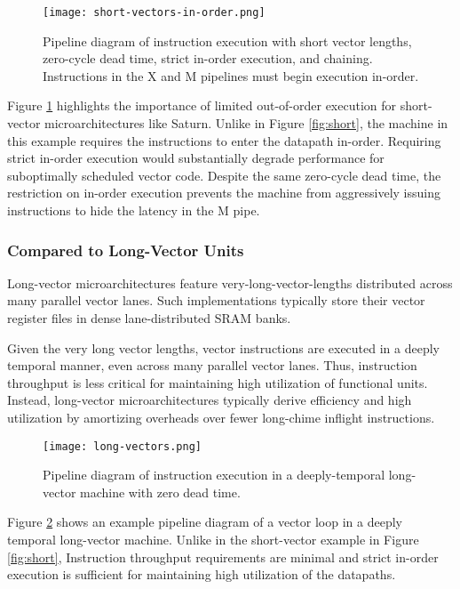 \begin{figure}[h]
  \centering
  \texttt{[image: short-vectors-in-order.png]}
  \caption{Pipeline diagram of instruction execution with short vector lengths, zero-cycle dead time, strict in-order execution, and chaining. Instructions in the X and M pipelines must begin execution in-order.}
  \label{fig:short-inorder}
\end{figure}

Figure \ref{fig:short-inorder} highlights the importance of limited out-of-order execution for short-vector microarchitectures like Saturn.
Unlike in Figure \ref{fig:short}, the machine in this example requires the instructions to enter the datapath in-order.
Requiring strict in-order execution would substantially degrade performance for suboptimally scheduled vector code.
Despite the same zero-cycle dead time, the restriction on in-order execution prevents the machine from aggressively issuing instructions to hide the latency in the M pipe.

\subsubsection{Compared to Long-Vector Units}

Long-vector microarchitectures feature very-long-vector-lengths distributed across many parallel vector lanes.
Such implementations typically store their vector register files in dense lane-distributed SRAM banks.

Given the very long vector lengths, vector instructions are executed in a deeply temporal manner, even across many parallel vector lanes.
Thus, instruction throughput is less critical for maintaining high utilization of functional units.
Instead, long-vector microarchitectures typically derive efficiency and high utilization by amortizing overheads over fewer long-chime inflight instructions.

\begin{figure}[h]
  \centering
  \texttt{[image: long-vectors.png]}
  \caption{Pipeline diagram of instruction execution in a deeply-temporal long-vector machine with zero dead time.}
  \label{fig:long}
\end{figure}

Figure \ref{fig:long} shows an example pipeline diagram of a vector loop in a deeply temporal long-vector machine.
Unlike in the short-vector example in Figure \ref{fig:short}, Instruction throughput requirements are minimal and strict in-order execution is sufficient for maintaining high utilization of the datapaths.

